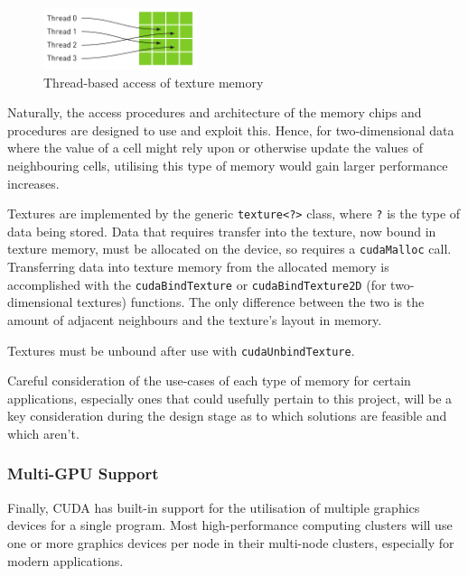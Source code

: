 \documentclass[conference]{IEEEtran}
\begin{document}
\begin{figure}[H]
    \centering
    \includegraphics[width=0.4\textwidth]{images/TextureMemory.png}
    \caption{Thread-based access of texture memory}
    \label{fig:texmem}
\end{figure}

Naturally, the access procedures and architecture of the memory chips and procedures are designed to use and exploit this. Hence, for two-dimensional data where the value of a cell might rely upon or otherwise update the values of neighbouring cells, utilising this type of memory would gain larger performance increases.

Textures are implemented by the generic \texttt{texture<?>} class, where \texttt{?} is the type of data being stored. Data that requires transfer into the texture, now bound in texture memory, must be allocated on the device, so requires a \texttt{cudaMalloc} call. Transferring data into texture memory from the allocated memory is accomplished with the \texttt{cudaBindTexture} or \texttt{cudaBindTexture2D} (for two-dimensional textures) functions. The only difference between the two is the amount of adjacent neighbours and the texture's layout in memory\cite{wilt2013cuda}.

Textures must be unbound after use with \texttt{cudaUnbindTexture}.

Careful consideration of the use-cases of each type of memory for certain applications, especially ones that could usefully pertain to this project, will be a key consideration during the design stage as to which solutions are feasible and which aren't.


\subsubsection{Multi-GPU Support}

Finally, CUDA has built-in support for the utilisation of multiple graphics devices for a single program. Most high-performance computing clusters will use one or more graphics devices per node in their multi-node clusters, especially for modern applications.
\end{document}
